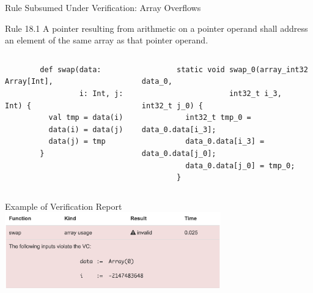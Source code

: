 \documentclass[xcolor={usenames,dvipsnames}]{beamer}
\begin{document}
\begin{frame}[fragile]{Rule Subsumed Under Verification: Array Overflows}


  \begin{exampleblock}{Rule 18.1}
    A pointer resulting from arithmetic on a pointer operand shall address an
    element of the same array as that pointer operand.
  \end{exampleblock}

  \pause

  \begin{columns}
    \begin{column}{0.3\textwidth}
      \begin{verbatim}
        def swap(data: Array[Int],
                 i: Int, j: Int) {
          val tmp = data(i)
          data(i) = data(j)
          data(j) = tmp
        }
      \end{verbatim}
    \end{column}
    \begin{column}{0.6\textwidth}
      \pause
      \begin{verbatim}
        static void swap_0(array_int32 data_0,
                    int32_t i_3, int32_t j_0) {
          int32_t tmp_0 = data_0.data[i_3];
          data_0.data[i_3] = data_0.data[j_0];
          data_0.data[j_0] = tmp_0;
        }
      \end{verbatim}
    \end{column}
  \end{columns}

  \pause

  \begin{alertblock}{Example of Verification Report}
    \centering \includegraphics[width=0.7\textwidth]{res/verification_error.png}
  \end{alertblock}



\end{frame}
\end{document}
